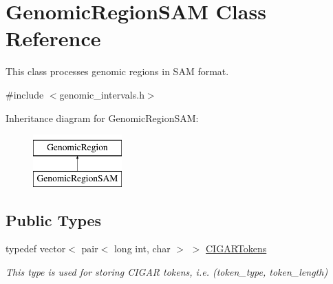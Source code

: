 \hypertarget{classGenomicRegionSAM}{
\section{GenomicRegionSAM Class Reference}
\label{classGenomicRegionSAM}
}


This class processes genomic regions in SAM format.  




{\ttfamily \#include $<$genomic\_\-intervals.h$>$}

Inheritance diagram for GenomicRegionSAM:\begin{figure}[H]
\begin{center}
\leavevmode
\includegraphics[height=2.000000cm]{classGenomicRegionSAM}
\end{center}
\end{figure}
\subsection*{Public Types}
\begin{DoxyCompactItemize}
\item 
\hypertarget{classGenomicRegionSAM_aadf8580c5362304ab4866fa76a59df96}{
typedef vector$<$ pair$<$ long int, char $>$ $>$ \hyperlink{classGenomicRegionSAM_aadf8580c5362304ab4866fa76a59df96}{CIGARTokens}}
\label{classGenomicRegionSAM_aadf8580c5362304ab4866fa76a59df96}

\begin{DoxyCompactList}\small\item\em This type is used for storing CIGAR tokens, i.e. (token\_\-type, token\_\-length) \end{DoxyCompactList}\end{DoxyCompactItemize}

